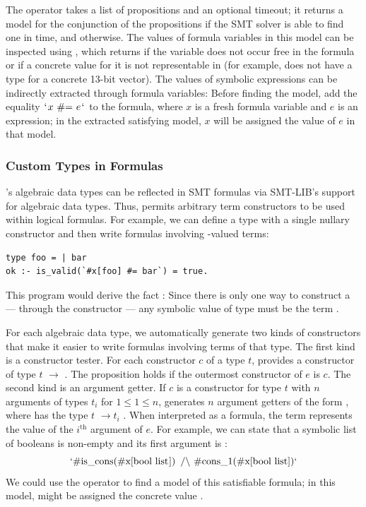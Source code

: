 \documentclass[acmsmall,screen,nonacm]{acmart}
\theoremstyle{definition}
\begin{document}
The operator  takes a list of propositions and an optional timeout; it
returns a model for the conjunction of the propositions if the SMT solver is able to find one in
time, and  otherwise.
The values of formula variables in this model can be inspected using
, which returns  if the variable does not occur free
in the formula or if a concrete value for it is not representable in \Name (for
example, \Name does not have a type for a concrete 13-bit vector).
The values of symbolic expressions can be indirectly extracted through formula
variables: Before finding the model, add the equality
$\ic{`}x~\ic{\#=}~e\ic{`}$ to the formula, where $x$ is a fresh formula
variable and $e$ is an expression; in the extracted satisfying model, $x$ will be assigned
the value of $e$ in that model. 

\subsubsection{Custom Types in Formulas}

\Name's algebraic data types can be reflected in SMT formulas via SMT-LIB's
support for algebraic data types.
Thus, \Name permits arbitrary term constructors to be used within logical
formulas.
For example, we can define a type  with a single nullary constructor
 and then write formulas involving -valued terms:
\begin{lstlisting}
type foo = | bar
ok :- is_valid(`#x[foo] #= bar`) = true.
\end{lstlisting}
This program would derive the fact : Since there is only one way to
construct a  --- through the constructor  --- any symbolic
value of type  must be the term .

For each algebraic data type, we automatically generate two kinds of
constructors that make it easier to write formulas involving terms of that
type.
The first kind is a constructor tester.
For each constructor $c$ of a type $t$, \Name provides a constructor
 of type $t$  $\rightarrow$ .
The proposition  holds if the outermost constructor of $e$ is
$c$.
The second kind is an argument getter.
If $c$ is a constructor for type $t$ with $n$ arguments of types $t_i$ for $1
\le 1 \le n$, \Name generates $n$ argument getters of the form ,
where  has the type $t$  $\rightarrow t_i$ .
When interpreted as a formula, the term  represents the
value of the $i^{\text{th}}$ argument of $e$.
For example, we can state that a symbolic list of booleans is non-empty and its
first argument is :
$$\ic{`\#is_cons(\#x[bool list]) /\\ \#cons_1(\#x[bool list])`}$$
We could use the operator  to find a model of this satisfiable
formula; in this model,  might be assigned the concrete
value .
\end{document}
